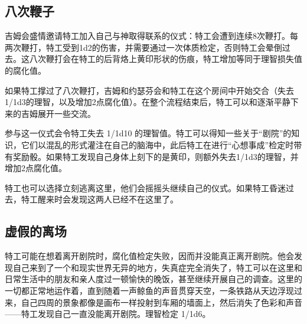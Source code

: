 \subsection{八次鞭子}

吉姆会盛情邀请特工加入自己与神取得联系的仪式：特工会遭到连续8次鞭打。每两次鞭打，特工受到1d2的伤害，并需要通过一次体质检定，否则特工会晕倒过去。这八次鞭打会在特工的后背烙上黄印形状的伤痕，特工增加等同于理智损失值的腐化值。

如果特工撑过了八次鞭打，吉姆和约瑟芬会和特工在这个房间中开始交合（失去1/1d3的理智，以及增加2点腐化值）。在整个流程结束后，特工可以和逐渐平静下来的吉姆展开一些交流。

参与这一仪式会令特工失去 1/1d10 的理智值。特工可以得知一些关于“剧院”的知识，它们以混乱的形式灌注在自己的脑海中，此后特工在进行“心想事成”检定时带有奖励骰。如果特工发现自己身体上刻下的是黄印，则额外失去1/1d3的理智，并增加2点腐化值。

特工也可以选择立刻逃离这里，他们会摇摇头继续自己的仪式。如果特工昏迷过去，特工醒来时会发现这两人已经不在这里了。

\subsection{虚假的离场}

特工可能在想着离开剧院时，腐化值检定失败，因而并没能真正离开剧院。他会发现自己来到了一个和现实世界无异的地方，失真症完全消失了，特工可以在这里和日常生活中的朋友和亲人度过一顿愉快的晚饭，甚至继续开展自己的调查。这里的一切都正常地运作着，直到随着一声鲸鱼的声音贯穿天空，一条铁路从天边浮现过来，自己四周的景象都像是画布一样投射到车厢的墙面上，然后消失了色彩和声音——特工发现自己一直没能离开剧院。理智检定 1/1d6。